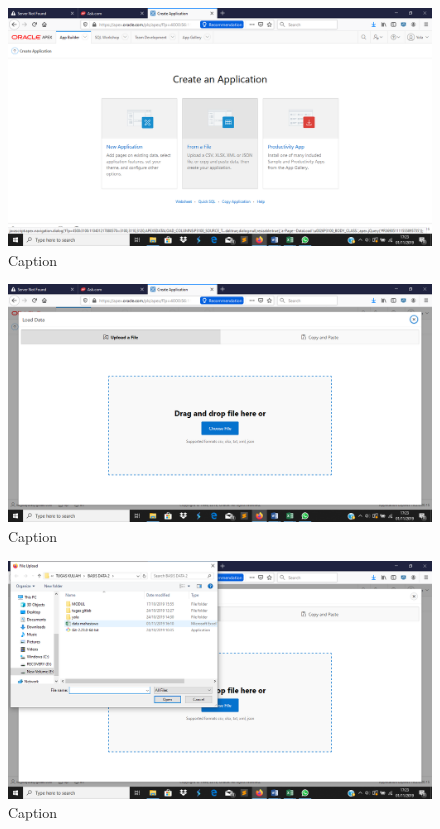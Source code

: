 \begin{enumerate}
\begin{figure}[!htbp]
    \centering
    \includegraphics[scale=0.3]{figure/12.png}
    \caption{Caption}
    \label{fig:my_label}
\end{figure}

\begin{figure}[!htbp]
    \centering
    \includegraphics[scale=0.3]{figure/13.png}
    \caption{Caption}
    \label{fig:my_label}
\end{figure}
\begin{figure}[!htbp]
    \centering
    \includegraphics[scale=0.3]{figure/14.png}
    \caption{Caption}
    \label{fig:my_label}
\end{figure}


\end{enumerate}
